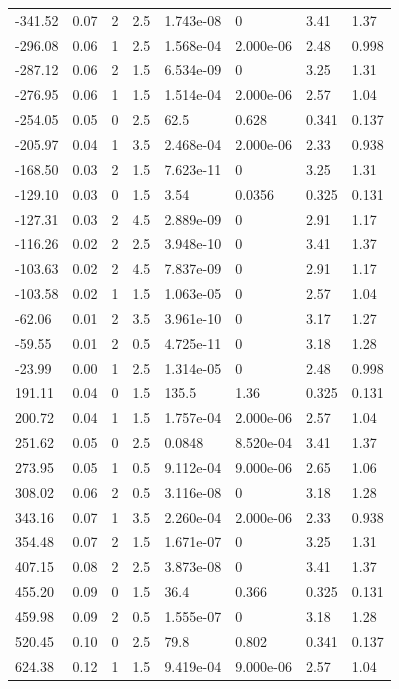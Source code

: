 \documentclass[preview]{standalone}
\begin{document}
{{\begin{tabular}{L{1.2cm}C{1.2cm} C{0.3cm}C{0.5cm} C{1.4cm}C{1.4cm} C{1.4cm}C{1.4cm}}
  -341.52  &  0.07  & 2     & 2.5 &  1.743e-08  & 0  & 3.41 &  1.37   \\ 
  -296.08  &  0.06  & 1     & 2.5 &  1.568e-04  & 2.000e-06  & 2.48 &  0.998   \\ 
  -287.12  &  0.06  & 2     & 1.5 &  6.534e-09  & 0  & 3.25 &  1.31   \\ 
  -276.95  &  0.06  & 1     & 1.5 &  1.514e-04  & 2.000e-06  & 2.57 &  1.04   \\ 
  -254.05  &  0.05  & 0     & 2.5 &  62.5  & 0.628  & 0.341 &  0.137   \\ 
  -205.97  &  0.04  & 1     & 3.5 &  2.468e-04  & 2.000e-06  & 2.33 &  0.938   \\ 
  -168.50  &  0.03  & 2     & 1.5 &  7.623e-11  & 0  & 3.25 &  1.31   \\ 
  -129.10  &  0.03  & 0     & 1.5 &  3.54  & 0.0356  & 0.325 &  0.131   \\ 
  -127.31  &  0.03  & 2     & 4.5 &  2.889e-09  & 0  & 2.91 &  1.17   \\ 
  -116.26  &  0.02  & 2     & 2.5 &  3.948e-10  & 0  & 3.41 &  1.37   \\ 
  -103.63  &  0.02  & 2     & 4.5 &  7.837e-09  & 0  & 2.91 &  1.17   \\ 
  -103.58  &  0.02  & 1     & 1.5 &  1.063e-05  & 0  & 2.57 &  1.04   \\ 
  -62.06  &  0.01  & 2     & 3.5 &  3.961e-10  & 0  & 3.17 &  1.27   \\ 
  -59.55  &  0.01  & 2     & 0.5 &  4.725e-11  & 0  & 3.18 &  1.28   \\ 
  -23.99  &  0.00  & 1     & 2.5 &  1.314e-05  & 0  & 2.48 &  0.998   \\ 
  191.11  &  0.04  & 0     & 1.5 &  135.5  & 1.36  & 0.325 &  0.131   \\ 
  200.72  &  0.04  & 1     & 1.5 &  1.757e-04  & 2.000e-06  & 2.57 &  1.04   \\ 
  251.62  &  0.05  & 0     & 2.5 &  0.0848  & 8.520e-04  & 3.41 &  1.37   \\ 
  273.95  &  0.05  & 1     & 0.5 &  9.112e-04  & 9.000e-06  & 2.65 &  1.06   \\ 
  308.02  &  0.06  & 2     & 0.5 &  3.116e-08  & 0  & 3.18 &  1.28   \\ 
  343.16  &  0.07  & 1     & 3.5 &  2.260e-04  & 2.000e-06  & 2.33 &  0.938   \\ 
  354.48  &  0.07  & 2     & 1.5 &  1.671e-07  & 0  & 3.25 &  1.31   \\ 
  407.15  &  0.08  & 2     & 2.5 &  3.873e-08  & 0  & 3.41 &  1.37   \\ 
  455.20  &  0.09  & 0     & 1.5 &  36.4  & 0.366  & 0.325 &  0.131   \\ 
  459.98  &  0.09  & 2     & 0.5 &  1.555e-07  & 0  & 3.18 &  1.28   \\ 
  520.45  &  0.10  & 0     & 2.5 &  79.8  & 0.802  & 0.341 &  0.137   \\ 
  624.38  &  0.12  & 1     & 1.5 &  9.419e-04  & 9.000e-06  & 2.57 &  1.04   \\ 
\hline 
\end{tabular} 

}}
\end{document}
